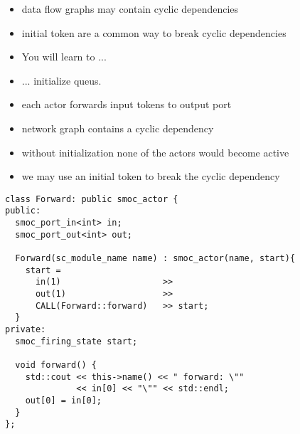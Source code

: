 \begin{frame}
\begin{itemize}
\item data flow graphs may contain cyclic dependencies
\item initial token are a common way to break cyclic dependencies
\end{itemize}
\begin{itemize}
\item You will learn to ...
\item ... initialize queus.
\end{itemize}
\end{frame}


\begin{frame}
\begin{figure}
\centering
\resizebox{0.9\columnwidth}{!}{}
\end{figure}
\begin{itemize}
\item each actor forwards input tokens to output port
\item network graph contains a cyclic dependency
\item without initialization none of the actors would become active
\item we may use an initial token to break the cyclic dependency
\end{itemize}
\end{frame}





\begin{frame}[fragile=singleslide]
\begin{lstlisting}
class Forward: public smoc_actor {
public:
  smoc_port_in<int> in;
  smoc_port_out<int> out;

  Forward(sc_module_name name) : smoc_actor(name, start){
    start = 
      in(1)                    >>
      out(1)                   >>
      CALL(Forward::forward)   >> start;
  }
private:
  smoc_firing_state start;

  void forward() {
    std::cout << this->name() << " forward: \""
              << in[0] << "\"" << std::endl;
    out[0] = in[0];
  }
};
\end{lstlisting}
\end{frame}





